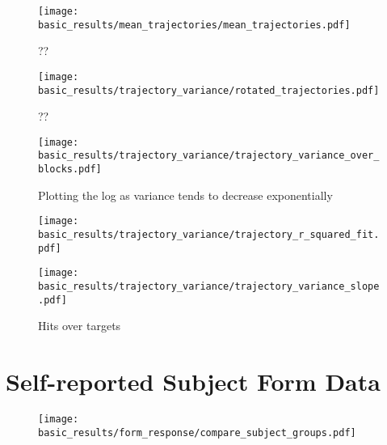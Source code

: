 \documentclass[../main.tex]{subfiles}
\begin{document}
\begin{figure}[H]
    \centering
    \texttt{[image: basic\_results/mean\_trajectories/mean\_trajectories.pdf]}
    \caption[Mean trajectories]{??}\label{fig:mean_trajectories}
\end{figure}

\begin{figure}[H]
    \centering
    \texttt{[image: basic\_results/trajectory\_variance/rotated\_trajectories.pdf]}
    \caption[Rotating trajectories]{??}\label{fig:rotated_trajectories}
\end{figure}


\begin{figure}[H]
    \centering
    \texttt{[image: basic\_results/trajectory\_variance/trajectory\_variance\_over\_blocks.pdf]}
    \caption[Trajectory variance over blocks]{Plotting the log as variance tends to decrease exponentially}\label{fig:trajectory_variance}
\end{figure}


\begin{figure}[H]
    \centering
    \begin{minipage}{0.49\textwidth}
        \texttt{[image: basic\_results/trajectory\_variance/trajectory\_r\_squared\_fit.pdf]}
        \subcaption{}
    \end{minipage}
    \begin{minipage}{0.49\textwidth}
        \texttt{[image: basic\_results/trajectory\_variance/trajectory\_variance\_slope.pdf]}
      \subcaption{}
    \end{minipage}
    \caption[Trajectory variance statistics]{Hits over targets}\label{fig:trajectory_variance_fits}
\end{figure}











\section{Self-reported Subject Form Data}

\begin{figure}[H]
    \centering
    \texttt{[image: basic\_results/form\_response/compare\_subject\_groups.pdf]}
    \caption[Subject group comparisons]{}\label{fig:compare_subject_groups}
\end{figure}
\end{document}
